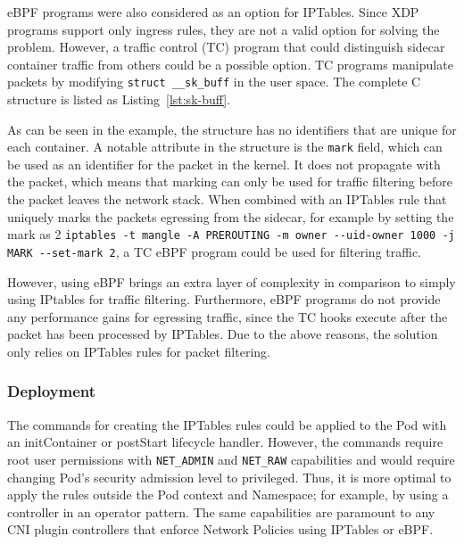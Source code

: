 \documentclass[english, 12pt, a4paper, sci, utf8, a-2b, online]{aaltothesis}
\begin{document}
eBPF programs were also considered as an option for IPTables.
Since XDP programs support only ingress rules, they are not a valid option for solving the problem.
However, a traffic control (TC) program that could distinguish sidecar container traffic from others could be a possible option.
TC programs manipulate packets by modifying \lstinline{struct __sk_buff} in the user space.
The complete C structure is listed as Listing~\ref{lst:sk-buff}.



As can be seen in the example, the structure has no identifiers that are unique for each container.
A notable attribute in the structure is the \lstinline{mark} field, which can be used as an identifier for the packet in the kernel.
It does not propagate with the packet, which means that marking can only be used for traffic filtering before the packet leaves the network stack.
When combined with an IPTables rule that uniquely marks the packets egressing from the sidecar, for example by setting the mark as 2 \lstinline{iptables -t mangle -A PREROUTING -m owner --uid-owner 1000 -j MARK --set-mark 2}, a TC eBPF program could be used for filtering traffic.

However, using eBPF brings an extra layer of complexity in comparison to simply using IPtables for traffic filtering.
Furthermore, eBPF programs do not provide any performance gains for egressing traffic, since the TC hooks execute after the packet has been processed by IPTables.
Due to the above reasons, the solution only relies on IPTables rules for packet filtering.

\subsubsection{Deployment} \label{sec:network-solution:deployment}

The commands for creating the IPTables rules could be applied to the Pod with an initContainer or postStart lifecycle handler.
However, the commands require root user permissions with \lstinline{NET_ADMIN} and \lstinline{NET_RAW} capabilities and would require changing Pod's security admission level to privileged.
Thus, it is more optimal to apply the rules outside the Pod context and Namespace; for example, by using a controller in an operator pattern.
The same capabilities are paramount to any CNI plugin controllers that enforce Network Policies using IPTables or eBPF.
\end{document}
